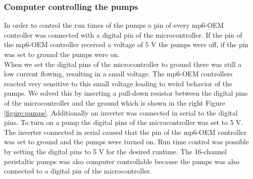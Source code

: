 \subsubsection{Computer controlling the pumps}
In order to control the run times of the pumps a pin of every mp6-OEM controller was connected with a digital pin of the microcontroller. If the pin of the mp6-OEM controller received a voltage of 5 V the pumps were off, if the pin was set to ground the pumps were on. \\
When we set the digital pins of the microcontroller to ground there was still a low current flowing, resulting in a small voltage. The mp6-OEM controllers reacted very sensitive to this small voltage leading to weird behavior of the pumps. We solved this by inserting a pull-down resistor between the digital pins of the microcontroller and the ground which is shown in the right Figure \ref{figure:pumps}. Additionally an inverter was connected in serial to the digital pins. To turn on a pump the digital pins of the microcontroller was set to 5 V. The inverter connected in serial caused that the pin of the mp6-OEM controller was set to ground and the pumps were turned on. Run time control was possible by setting the digital pins to 5 V for the desired runtime.
The 16-channel peristaltic pumps was also computer controllable because the pumps was also connected to a digital pin of the microcontroller.
\label{section:pumps}

